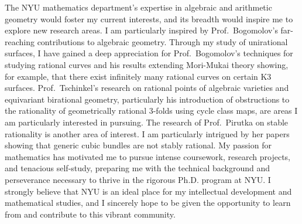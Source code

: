 \documentclass[11pt]{article}
\begin{document}
The NYU mathematics department's expertise in algebraic and arithmetic geometry would foster my current interests, and its breadth would inspire me to explore new research areas. I am particularly inspired by Prof.\ Bogomolov’s far-reaching contributions to algebraic geometry. Through my study of unirational surfaces, I have gained a deep appreciation for Prof.\ Bogomolov’s techniques for studying rational curves and his results extending Mori-Mukai theory showing, for example, that there exist infinitely many rational curves on certain K3 surfaces. Prof.\ Tschinkel’s research on rational points of algebraic varieties and equivariant birational geometry, particularly his introduction of obstructions to the rationality of geometrically rational 3-folds using cycle class maps, are areas I am particularly interested in pursuing. The research of Prof.\ Pirutka on stable rationality is another area of interest. I am particularly intrigued by her papers showing that generic cubic bundles are not stably rational. My passion for mathematics has motivated me to pursue intense coursework, research projects, and tenacious self-study, preparing me with the technical background and perseverance necessary to thrive in the rigorous Ph.D. program at NYU. I strongly believe that NYU is an ideal place for my intellectual development and mathematical studies, and I sincerely hope to be given the opportunity to learn from and contribute to this vibrant community.
\end{document}
